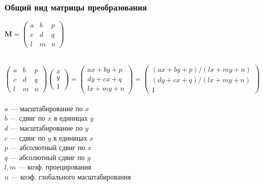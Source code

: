 \documentclass[10pt]{beamer}
\begin{document}
\begin{frame}\frametitle{Общий вид матрицы преобразования}
	
	{
		\centering
		
		$   \textbf{M}=
		\begin{pmatrix}
			a&b&p\\
			c&d&q\\
			l&m&n
		\end{pmatrix}
		$ \\ ~ \\
	}
	

		$
		\begin{pmatrix}
			a&b&p\\
			c&d&q\\
			l&m&n
		\end{pmatrix}
		\begin{pmatrix}
			x\\
			y\\
			1
		\end{pmatrix}
		=
		\begin{pmatrix}
			ax+by+p \\
			dy+cx+q \\
			lx+my+n
		\end{pmatrix}
		=
		\begin{pmatrix}
			(ax+by+p)/(lx+my+n) \\
			(dy+cx+q)/(lx+my+n) \\
			1
		\end{pmatrix}		
		$ \\ ~ \\

		$a$ --- масштабирование по $x$ \\
		$b$ --- сдвиг по $x$ в единицах $y$\\
		$d$ --- масштабирование по $y$\\
		$c$ --- сдвиг по $y$ в единицах $x$ \\
		$p$ --- абсолютный сдвиг по $x$ \\
		$q$ --- абсолютный сдвиг по $y$ \\
		$l,m$ --- коэф. проецирования \\
		$n$ --- коэф. глобального масштабирования
	

	
	
\end{frame}
\end{document}
